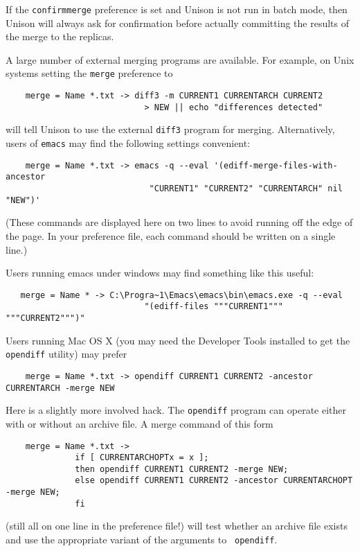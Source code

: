 \documentclass{article}
\begin{document}
If the \verb|confirmmerge| preference is set and Unison is not run in
batch mode, then Unison will always ask for confirmation before
actually committing the results of the merge to the replicas.

A large number of external merging programs are available.  
For example, on Unix systems setting the \verb|merge| preference to
\begin{verbatim}
    merge = Name *.txt -> diff3 -m CURRENT1 CURRENTARCH CURRENT2
                            > NEW || echo "differences detected"
\end{verbatim}
\noindent
will tell Unison to use the external \verb|diff3| program for merging.  
%
Alternatively, users of \verb|emacs| may find the following settings convenient:
\begin{verbatim}
    merge = Name *.txt -> emacs -q --eval '(ediff-merge-files-with-ancestor 
                             "CURRENT1" "CURRENT2" "CURRENTARCH" nil "NEW")' 
\end{verbatim}
\noindent
(These commands are displayed here on two lines to avoid running off the
edge of the page.  In your preference file, each command should be written on a
single line.) 

Users running emacs under windows may find something like this useful:
\begin{verbatim}
   merge = Name * -> C:\Progra~1\Emacs\emacs\bin\emacs.exe -q --eval
                            "(ediff-files """CURRENT1""" """CURRENT2""")"
\end{verbatim}

Users running Mac OS X (you may need the Developer Tools installed to get
the {\tt opendiff} utility) may prefer
\begin{verbatim}
    merge = Name *.txt -> opendiff CURRENT1 CURRENT2 -ancestor CURRENTARCH -merge NEW
\end{verbatim}
Here is a slightly more involved hack.  The {\tt opendiff} program can
operate either with or without an archive file.  A merge command of this
form 
\begin{verbatim}
    merge = Name *.txt -> 
              if [ CURRENTARCHOPTx = x ]; 
              then opendiff CURRENT1 CURRENT2 -merge NEW; 
              else opendiff CURRENT1 CURRENT2 -ancestor CURRENTARCHOPT -merge NEW; 
              fi
\end{verbatim}
(still all on one line in the preference file!) will test whether an archive
file exists and use the appropriate variant of the arguments to {\tt
  opendiff}. 
\end{document}
